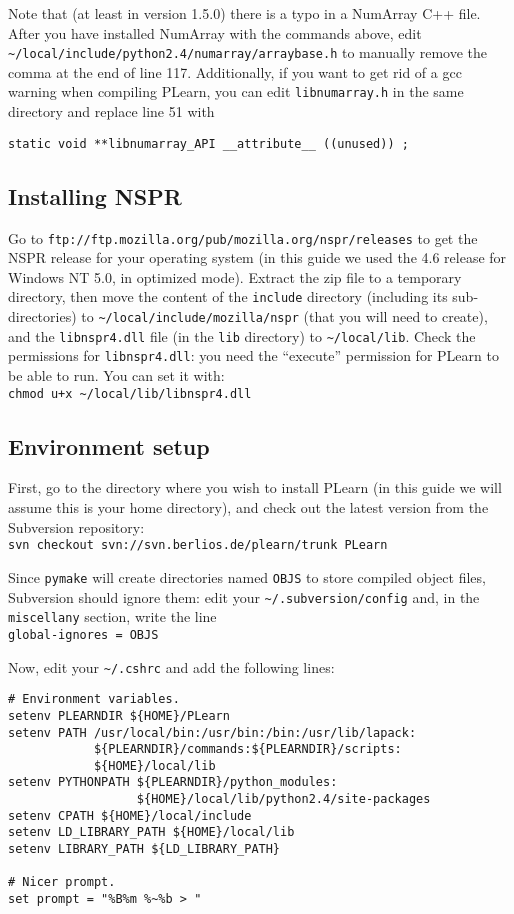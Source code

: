 \documentclass[11pt]{book}
\begin{document}
Note that (at least in version 1.5.0) there is a typo in a NumArray C++ file.
After you have installed NumArray with the commands above, edit
\verb!~/local/include/python2.4/numarray/arraybase.h! to manually remove the comma
at the end of line 117. Additionally, if you want to get rid of a gcc warning
when compiling PLearn, you can edit \verb!libnumarray.h!
in the same directory and replace line 51 with
\begin{verbatim}
static void **libnumarray_API __attribute__ ((unused)) ;
\end{verbatim}

\subsection{Installing NSPR}

Go to \verb!ftp://ftp.mozilla.org/pub/mozilla.org/nspr/releases! to get
the NSPR release for your operating system (in this guide we used the
4.6 release for Windows NT 5.0, in optimized mode).
Extract the zip file to a temporary directory, then move the content of the
\verb!include! directory (including its sub-directories) to \verb!~/local/include/mozilla/nspr! (that you
will need to create), and the
\verb!libnspr4.dll! file (in the \verb!lib! directory) to \verb!~/local/lib!.
Check the permissions for \verb!libnspr4.dll!: you need the ``execute'' permission
for PLearn to be able to run. You can set it with:\\
\verb!chmod u+x ~/local/lib/libnspr4.dll!


\subsection{Environment setup}

First, go to the directory
where you wish to install PLearn (in this guide we will assume this is your
home directory), and check out the latest
version from the Subversion repository:\\
\verb!svn checkout svn://svn.berlios.de/plearn/trunk PLearn!

Since \verb!pymake! will create directories named \verb!OBJS! to store
compiled object files, Subversion should ignore them: edit
your \verb!~/.subversion/config! and, in the \verb!miscellany! section,
write the line\\
\verb!global-ignores = OBJS!

Now, edit your \verb!~/.cshrc! and add the following lines:

\begin{verbatim}
# Environment variables.
setenv PLEARNDIR ${HOME}/PLearn
setenv PATH /usr/local/bin:/usr/bin:/bin:/usr/lib/lapack:
            ${PLEARNDIR}/commands:${PLEARNDIR}/scripts:
            ${HOME}/local/lib
setenv PYTHONPATH ${PLEARNDIR}/python_modules:
                  ${HOME}/local/lib/python2.4/site-packages
setenv CPATH ${HOME}/local/include
setenv LD_LIBRARY_PATH ${HOME}/local/lib
setenv LIBRARY_PATH ${LD_LIBRARY_PATH}

# Nicer prompt.
set prompt = "%B%m %~%b > "
\end{verbatim}
\end{document}
